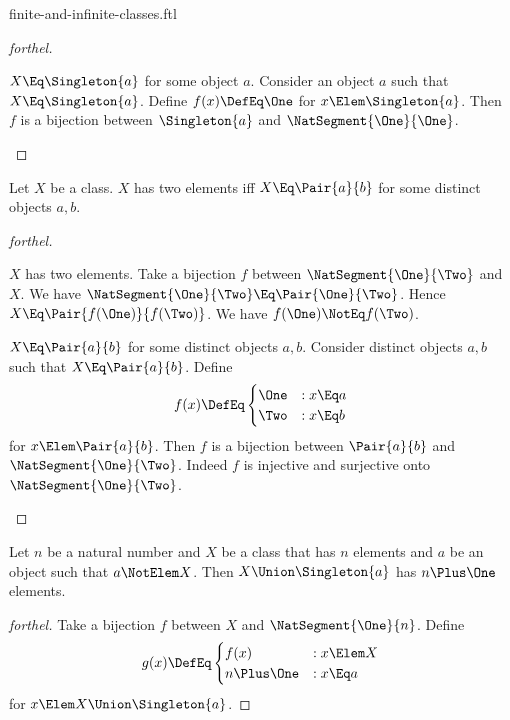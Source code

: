 \documentclass{stex}
\begin{document}
\begin{smodule}{finite-and-infinite-classes.ftl}
\begin{proof}[forthel]
  \begin{case}{$X \Eq \Singleton{a}$ for some object $a$.}
    Consider an object $a$ such that $X \Eq \Singleton{a}$.
    Define $f(x) \DefEq \One$ for $x \Elem \Singleton{a}$.
    Then $f$ is a bijection between $\Singleton{a}$ and $\NatSegment{\One}{\One}$.
  \end{case}
\end{proof}

\begin{proposition*}[forthel]
  Let $X$ be a class.
  $X$ has two elements iff $X \Eq \Pair{a}{b}$ for some distinct objects $a, b$.
\end{proposition*}
\begin{proof}[forthel]
  \begin{case}{$X$ has two elements.}
    Take a bijection $f$ between $\NatSegment{\One}{\Two}$ and $X$.
    We have $\NatSegment{\One}{\Two} \Eq \Pair{\One}{\Two}$.
    Hence $X \Eq \Pair{f(\One)}{f(\Two)}$.
    We have $f(\One) \NotEq f(\Two)$.
  \end{case}

  \begin{case}{$X \Eq \Pair{a}{b}$ for some distinct objects $a, b$.}
    Consider distinct objects $a, b$ such that $X \Eq \Pair{a}{b}$.
    Define \[f(x) \DefEq
      \begin{cases}
        \One & : x \Eq a \\
        \Two & : x \Eq b
      \end{cases}\]
    for $x \Elem \Pair{a}{b}$.
    Then $f$ is a bijection between $\Pair{a}{b}$ and $\NatSegment{\One}{\Two}$.
    Indeed $f$ is injective and surjective onto $\NatSegment{\One}{\Two}$.
  \end{case}
\end{proof}

\begin{proposition*}[forthel]
  Let $n$ be a natural number and $X$ be a class that has $n$ elements and $a$ be an object such that $a \NotElem X$.
  Then $X \Union \Singleton{a}$ has $n \Plus \One$ elements.
\end{proposition*}
\begin{proof}[forthel]
  Take a bijection $f$ between $X$ and $\NatSegment{\One}{n}$.
  Define \[g(x) \DefEq
    \begin{cases}
      f(x)  & : x \Elem X \\
      n \Plus \One & : x \Eq a
    \end{cases}\]
  for $x \Elem X \Union \Singleton{a}$.


\end{proof}
\end{smodule}
\end{document}
